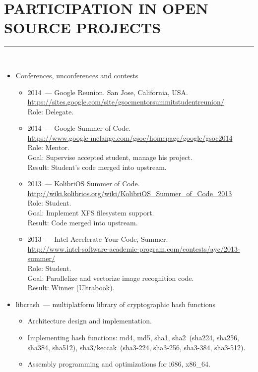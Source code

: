 \documentclass[a4paper,oneside,12pt]{article}
\newcommand{\cvpart}[1]{%
\vspace{-0.9em}%
\section*{\Large\bfseries\MakeTextUppercase{#1}}%
\vspace{-1.7em}%
\rule{\linewidth}{0.3em}\\[-0.8em]%
}
\begin{document}
\cvpart{Participation in Open Source Projects}
\begin{itemize}
\item Conferences, unconferences and contests
\begin{itemize}
\item 2014~--- Google Reunion. San Jose, California, USA.\\
{\color{gray}\small\url{https://sites.google.com/site/gsocmentorsummitstudentreunion/}}\\
Role: Delegate.
\item 2014~--- Google Summer of Code.\\
{\color{gray}\small\url{https://www.google-melange.com/gsoc/homepage/google/gsoc2014}}\\
Role: Mentor.\\
Goal: Supervise accepted student, manage his project.\\
Result: Student's code merged into upstream.
\item 2013~--- KolibriOS Summer of Code.\\
{\color{gray}\small\url{http://wiki.kolibrios.org/wiki/KolibriOS_Summer_of_Code_2013}}\\
Role: Student.\\
Goal: Implement XFS filesystem support.\\
Result: Code merged into upstream.
\item 2013~--- Intel Accelerate Your Code, Summer.\\
{\color{gray}\small\url{http://www.intel-software-academic-program.com/contests/ayc/2013-summer/}}\\
Role: Student.\\
Goal: Parallelize and vectorize image recognition code.\\
Result: Winner (Ultrabook).
\end{itemize}
\item libcrash~--- multiplatform library of cryptographic hash functions
\begin{itemize}
\item Architecture design and implementation.
\item Implementing hash functions: md4, md5, sha1, sha2~(sha224, sha256, sha384, sha512), sha3/keccak~(sha3-224, sha3-256, sha3-384, sha3-512).
\item Assembly programming and optimizations for i686, x86\_64.
\end{itemize}


\end{itemize}
\end{document}
